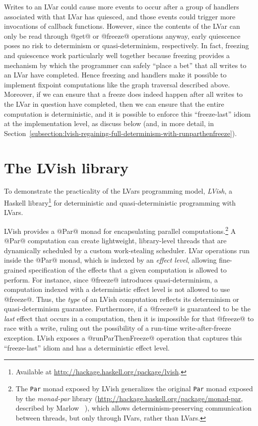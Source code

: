 Writes to an LVar could cause more events to occur after a group of handlers associated
with that LVar has quiesced, and those events could trigger more
invocations of callback functions.  However, since the contents of the
LVar can only be read through @get@ or @freeze@
operations anyway, early quiescence poses no risk to determinism or
quasi-determinism, respectively.  In fact, freezing and quiescence
work particularly well together because freezing provides a mechanism
by which the programmer can safely ``place a bet'' that all writes to an LVar
have completed.  Hence freezing and handlers make it possible to implement fixpoint
computations like the graph traversal described above.  Moreover, if
we can ensure that a freeze does indeed happen after all writes to the LVar in question have
completed, then we can ensure that the entire computation is deterministic,
and it is possible to enforce this ``freeze-last'' idiom at the
implementation level, as  discuss below (and, in more detail, in
Section~\ref{subsection:lvish-regaining-full-determinism-with-runparthenfreeze}).

\section{The LVish library}\label{s:intro-lvish}

To demonstrate the practicality of the LVars programming model, 
\emph{LVish}, a Haskell library\footnote{Available at
  \url{http://hackage.haskell.org/package/lvish}.}
for deterministic and quasi-deterministic programming with LVars.

LVish provides a @Par@ monad for encapsulating parallel computations.\footnote{The
  \lstinline|Par| monad exposed by LVish generalizes the original
  \lstinline|Par| monad exposed by the \emph{monad-par} library
  ({\url{http://hackage.haskell.org/package/monad-par}}, described by
  Marlow \etal~\cite{monad-par}), which allows determinism-preserving
  communication between threads, but only through IVars, rather than
  LVars.}
A @Par@ computation can create lightweight, library-level threads that
are dynamically scheduled by a custom work-stealing scheduler.
LVar operations run inside the @Par@ monad, which is
indexed by an \emph{effect level}, allowing fine-grained specification
of the effects that a given computation is allowed to perform.  For
instance, since @freeze@ introduces quasi-determinism, a computation
indexed with a deterministic effect level is not allowed to use
@freeze@.  Thus, the \emph{type} of an LVish computation reflects its
determinism or quasi-determinism guarantee.  Furthermore, if a
@freeze@ is guaranteed to be the \emph{last} effect that occurs in a
computation, then it is impossible for that @freeze@ to race with a
write, ruling out the possibility of a run-time write-after-freeze
exception.  LVish exposes a @runParThenFreeze@ operation that captures
this ``freeze-last'' idiom and has a deterministic effect level.

